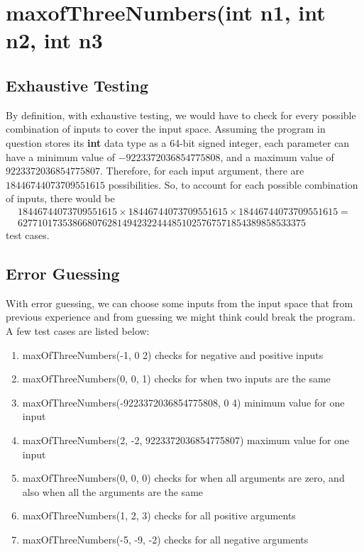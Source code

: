 \documentclass[letterpaper]{article}
\begin{document}
\section{maxofThreeNumbers(int n1, int n2, int n3}
\subsection{Exhaustive Testing}
By definition, with exhaustive testing, we would have to check for every
possible combination of inputs to cover the input space.
Assuming the program in question stores its
\textbf{int} data type as a 64-bit signed integer, each parameter can
have a minimum value of $-9223372036854775808$, and a maximum value of
$9223372036854775807$. Therefore, for each input argument, there are
$18446744073709551615$ possibilities. So, to account for each possible
combination of inputs, there would be
\begin{multline*}
	18446744073709551615 \times 18446744073709551615 \times 18446744073709551615 = \\ 6277101735386680762814942322444851025767571854389858533375
\end{multline*}
test cases.

\subsection{Error Guessing}
With error guessing, we can choose some inputs from the input space
that from previous experience and from guessing we might think could
break the program. A few test cases are listed below:

\begin{enumerate}
	\item maxOfThreeNumbers(-1, 0 2) checks for negative and positive inputs
	\item maxOfThreeNumbers(0, 0, 1) checks for when two inputs are the same
	\item maxOfThreeNumbers(-9223372036854775808, 0 4) minimum value for one input
	\item maxOfThreeNumbers(2, -2, 9223372036854775807) maximum value for one input
	\item maxOfThreeNumbers(0, 0, 0) checks for when all arguments are zero, and also when all the arguments are the same
	\item maxOfThreeNumbers(1, 2, 3) checks for all positive arguments
	\item maxOfThreeNumbers(-5, -9, -2) checks for all negative arguments
\end{enumerate}
\end{document}
